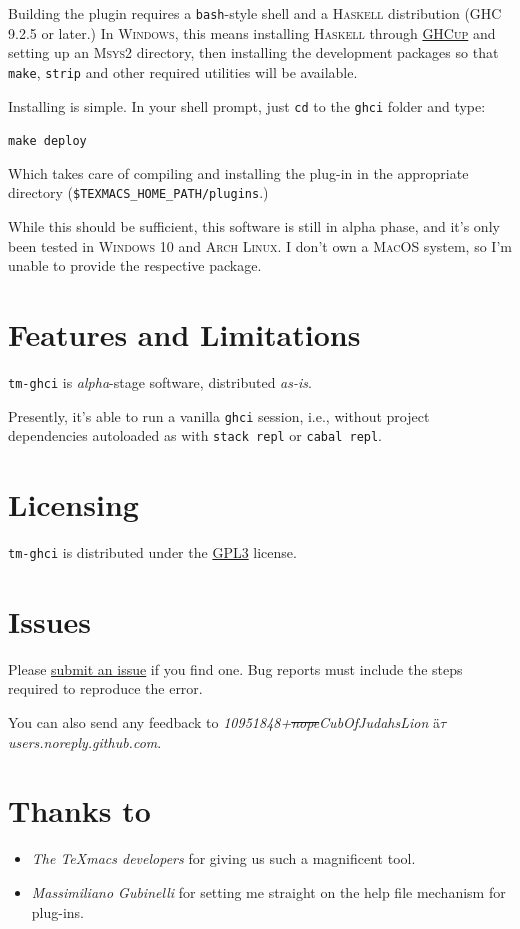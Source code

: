 \documentclass{article}
\renewcommand{\emph}[1]{\textit{#1}}
\begin{document}
Building the plugin requires a \texttt{bash}-style shell and a
{\textsc{Haskell}} distribution ({\textsc{GHC}} 9.2.5 or later.) In
{\textsc{Windows}}, this means installing {\textsc{Haskell}} through
{\textsc{\href{https://www.haskell.org/ghcup/}{GHCup}}} and setting up an
{\textsc{Msys2}} directory, then installing the development packages so that
\texttt{make}, \texttt{strip} and other required utilities will be
available.

Installing is simple. In your shell prompt, just \texttt{cd} to
the \texttt{ghci} folder and type:

\texttt{make deploy}

Which takes care of compiling and installing the plug-in in the appropriate
directory (\texttt{\$TEXMACS\_HOME\_PATH/plugins}.)

While this should be sufficient, this software is still in alpha phase, and
it's only been tested in {\textsc{Windows}} 10 and {\textsc{Arch Linux}}. I
don't own a {\textsc{MacOS}} system, so I'm unable to provide the respective
package.

\section{Features and Limitations}

\texttt{tm-ghci} is {\emph{alpha}}-stage software, distributed
{\emph{as-is}}.

Presently, it's able to run a vanilla \texttt{ghci} session, i.e., without
project dependencies autoloaded as with \texttt{stack repl} or
\texttt{cabal repl}.

\section{Licensing}

\texttt{tm-ghci} is distributed under the
\href{https://www.gnu.org/licenses/gpl-3.0.en.html}{\textsc{GPL3}}
license.

\section{Issues}

Please \href{https://github.com/CubOfJudahsLion/tm-ghci/issues}{submit an
issue} if you find one. Bug reports must include the steps required to
reproduce the error.

You can also send any feedback to
\emph{10951848+\sout{nope}CubOfJudahsLion} {\"a}{$\tau$}
\emph{users.noreply.github.com}.

\section{Thanks to}

\begin{itemize}
  \item {\emph{The TeXmacs developers}} for giving us such a magnificent tool.
  \item {\emph{Massimiliano Gubinelli}} for setting me straight on the help
  file mechanism for plug-ins.
\end{itemize}
\end{document}
